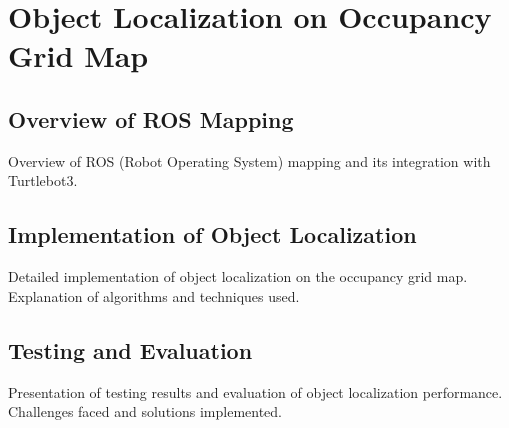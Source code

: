 \chapter{Object Localization on Occupancy Grid Map}
\section{Overview of ROS Mapping}
Overview of ROS (Robot Operating System) mapping and its integration with Turtlebot3.

\section{Implementation of Object Localization}
Detailed implementation of object localization on the occupancy grid map. Explanation of algorithms and techniques used.

\section{Testing and Evaluation}
Presentation of testing results and evaluation of object localization performance. Challenges faced and solutions implemented.
